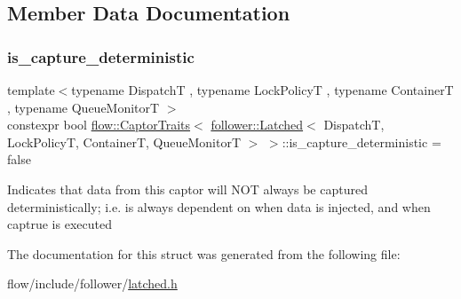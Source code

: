 \subsection{Member Data Documentation}
\mbox{\label{structflow_1_1_captor_traits_3_01follower_1_1_latched_3_01_dispatch_t_00_01_lock_policy_t_00_01_7069ffe3c5f41ae454dc415b835f945a_a1658ae448bc61a7b26d895c405672e9b}} 
\subsubsection{\texorpdfstring{is\+\_\+capture\+\_\+deterministic}{is\_capture\_deterministic}}
{\footnotesize\ttfamily template$<$typename DispatchT , typename Lock\+PolicyT , typename ContainerT , typename Queue\+MonitorT $>$ \\
constexpr bool \hyperlink{structflow_1_1_captor_traits}{flow\+::\+Captor\+Traits}$<$ \hyperlink{classflow_1_1follower_1_1_latched}{follower\+::\+Latched}$<$ DispatchT, Lock\+PolicyT, ContainerT, Queue\+MonitorT $>$ $>$\+::is\+\_\+capture\+\_\+deterministic = false\hspace{0.3cm}{\ttfamily [static]}}

Indicates that data from this captor will N\+OT always be captured deterministically; i.\+e. is always dependent on when data is injected, and when captrue is executed 

The documentation for this struct was generated from the following file\+:\begin{DoxyCompactItemize}
\item 
flow/include/follower/\hyperlink{latched_8h}{latched.\+h}\end{DoxyCompactItemize}
